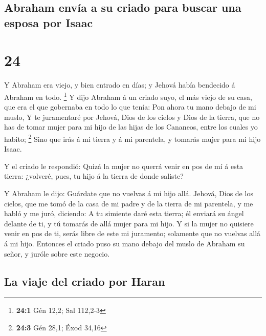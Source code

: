\hypertarget{abraham-envuxeda-a-su-criado-para-buscar-una-esposa-por-isaac}{%
\subsection{Abraham envía a su criado para buscar una esposa por
Isaac}\label{abraham-envuxeda-a-su-criado-para-buscar-una-esposa-por-isaac}}

\hypertarget{section-23}{%
\section{24}\label{section-23}}

 Y Abraham era viejo, y bien entrado en días; y Jehová
había bendecido á Abraham en todo. \footnote{\textbf{24:1} Gén 12,2; Sal
  112,2-3}  Y dijo Abraham á un criado suyo, el más viejo
de su casa, que era el que gobernaba en todo lo que tenía: Pon ahora tu
mano debajo de mi muslo,  Y te juramentaré por Jehová,
Dios de los cielos y Dios de la tierra, que no has de tomar mujer para
mi hijo de las hijas de los Cananeos, entre los cuales yo habito;
\footnote{\textbf{24:3} Gén 28,1; Éxod 34,16}  Sino que
irás á mi tierra y á mi parentela, y tomarás mujer para mi hijo Isaac.

 Y el criado le respondió: Quizá la mujer no querrá venir
en pos de mí á esta tierra: ¿volveré, pues, tu hijo á la tierra de donde
saliste?

 Y Abraham le dijo: Guárdate que no vuelvas á mi hijo
allá.  Jehová, Dios de los cielos, que me tomó de la casa
de mi padre y de la tierra de mi parentela, y me habló y me juró,
diciendo: A tu simiente daré esta tierra; él enviará su ángel delante de
ti, y tú tomarás de allá mujer para mi hijo.  Y si la
mujer no quisiere venir en pos de ti, serás libre de este mi juramento;
solamente que no vuelvas allá á mi hijo.  Entonces el
criado puso su mano debajo del muslo de Abraham su señor, y juróle sobre
este negocio.

\hypertarget{la-viaje-del-criado-por-haran}{%
\subsection{La viaje del criado por
Haran}\label{la-viaje-del-criado-por-haran}}


